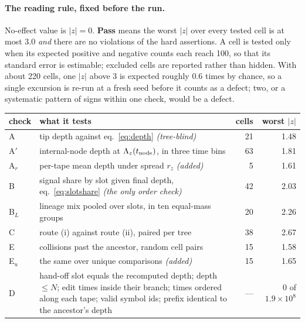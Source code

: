 \paragraph{The reading rule, fixed before the run.} No-effect value is $|z|=0$. \textbf{Pass} means
the worst $|z|$ over every tested cell is at most $3.0$ \emph{and} there are no violations of the hard
assertions. A cell is tested only when its expected positive and negative counts each reach 100, so
that its standard error is estimable; excluded cells are reported rather than hidden. With about 220
cells, one $|z|$ above $3$ is expected roughly $0.6$ times by chance, so a single excursion is re-run
at a fresh seed before it counts as a defect; two, or a systematic pattern of signs within one check,
would be a defect.

\begin{center}\small
\begin{tabular}{@{}l p{} r r@{}}
\toprule
check & what it tests & cells & worst $|z|$ \\
\midrule
A    & tip depth against eq.~\eqref{eq:depth} \emph{(tree-blind)}                 & 21 & 1.48 \\
A$'$ & internal-node depth at $\Lambda_z(t_{\rm node})$, in three time bins       & 63 & 1.81 \\
A$_r$& per-tape mean depth under spread $r_z$ \emph{(added)}                      & 5  & 1.61 \\
B    & signal share by slot given final depth, eq.~\eqref{eq:slotshare}
       \emph{(the only order check)}                                              & 42 & 2.03 \\
B$_L$& lineage mix pooled over slots, in ten equal-mass groups                    & 20 & 2.26 \\
C    & route (i) against route (ii), paired per tree                              & 38 & 2.67 \\
E    & collisions past the ancestor, random cell pairs                            & 15 & 1.58 \\
E$_u$& the same over unique comparisons \emph{(added)}                            & 15 & 1.65 \\
D    & hand-off slot equals the recomputed depth; depth $\le N$; edit times inside their branch;
       times ordered along each tape; valid symbol ids; prefix identical to the ancestor's depth
       & --- & $0$ of $1.9{\times}10^{8}$ \\
\bottomrule
\end{tabular}
\end{center}

